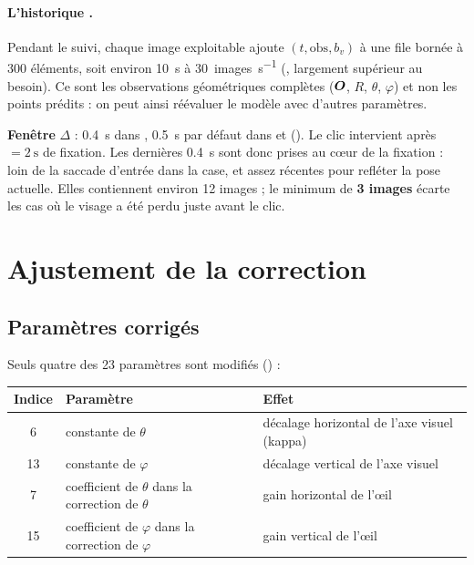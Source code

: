 \paragraph{L'historique .} Pendant le suivi, chaque image exploitable ajoute $(t, \text{obs}, b_v)$ à une file bornée à 300 éléments, soit environ \qty{10}{\second} à \qty{30}{images\per\second} (\empi, largement supérieur au besoin). Ce sont les observations géométriques complètes ($\bm{O}$, $R$, $\theta$, $\varphi$) et non les points prédits : on peut ainsi réévaluer le modèle avec d'autres paramètres.

\begin{origine}
\textbf{Fenêtre} $\Delta$ : \qty{0.4}{\second} dans , \qty{0.5}{\second} par défaut dans  et  (\empi). Le clic intervient après  $= \qty{2}{\second}$ de fixation. Les dernières \qty{0.4}{\second} sont donc prises au cœur de la fixation : loin de la saccade d'entrée dans la case, et assez récentes pour refléter la pose actuelle. Elles contiennent environ 12 images ; le minimum de \textbf{3 images} écarte les cas où le visage a été perdu juste avant le clic.
\end{origine}

\section{Ajustement de la correction}

\subsection{Paramètres corrigés}

Seuls quatre des 23 paramètres sont modifiés () :
\begin{center}
\begin{tabular}{@{}cll@{}}
\toprule
Indice & Paramètre & Effet \\
\midrule
6 & constante de $\theta$ & décalage horizontal de l'axe visuel (kappa) \\
13 & constante de $\varphi$ & décalage vertical de l'axe visuel \\
7 & coefficient de $\theta$ dans la correction de $\theta$ & gain horizontal de l'œil \\
15 & coefficient de $\varphi$ dans la correction de $\varphi$ & gain vertical de l'œil \\
\bottomrule
\end{tabular}
\end{center}

